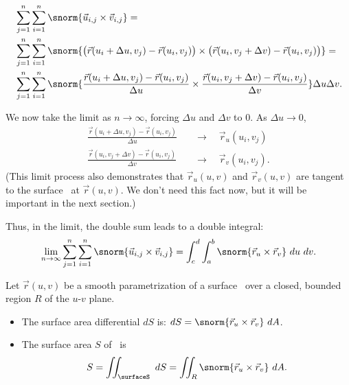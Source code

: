 \begin{align*}
&\sum_{j=1}^n\sum_{i=1}^n \snorm{\vec u_{i,j}\times \vec v_{i,j}}= \\ 
&\sum_{j=1}^n\sum_{i=1}^n \snorm{\big(\vec r(u_i+\Delta u,v_j) - \vec r(u_i,v_j)\big) \times \big(\vec r(u_i,v_j+\Delta v)-\vec r(u_i,v_j)\big)}= \\
&\sum_{j=1}^n\sum_{i=1}^n \snorm{\frac{\vec r(u_i+\Delta u,v_j) - \vec r(u_i,v_j)}{\Delta u} \times \frac{\vec r(u_i,v_j+\Delta v)-\vec r(u_i,v_j)}{\Delta v}}\Delta u\Delta v.
\end{align*}

We now take the limit as $n\to\infty$, forcing $\Delta u$ and $\Delta v$ to 0. As $\Delta u\to 0$,
\begin{align*}
\frac{\vec{r}(u_i+\Delta u,v_j) - \vec{r}(u_i,v_j)}{\Delta u}&\quad \to\quad \vec{r}_u(u_i,v_j)\tag*{ and}\\ 
\frac{\vec{r}(u_i,v_j+\Delta v)-\vec{r}(u_i,v_j)}{\Delta v}&\quad \to\quad \vec{r}_v(u_i,v_j).
\end{align*}
(This limit process also demonstrates that $\vec r_u(u,v)$ and $\vec r_v(u,v)$ are tangent to the surface \surfaceS\ at $\vec r(u,v)$. We don't need this fact now, but it will be important in the next section.)

Thus, in the limit, the double sum leads to a double integral:
\[
\lim_{n\to\infty} \sum_{j=1}^n\sum_{i=1}^n \snorm{\vec u_{i,j}\times \vec v_{i,j}}= \int_c^d\int_a^b \snorm{\vec r_u\times\vec r_v}\ du\ dv.
\]

{Let $\vec r(u,v)$ be a smooth parametrization of a surface \surfaceS\ over a closed, bounded region $R$ of the $u$-$v$ plane. 
\begin{itemize}
\item	The surface area differential $dS$ is: $dS = \snorm{\vec r_u\times \vec r_v}\ dA$.
\item The surface area $S$ of \surfaceS\ is
\[
S = \iint_\surfaceS\ dS = \iint_R \snorm{\vec r_u\times \vec r_v}\ dA.
\]
\end{itemize}
}

